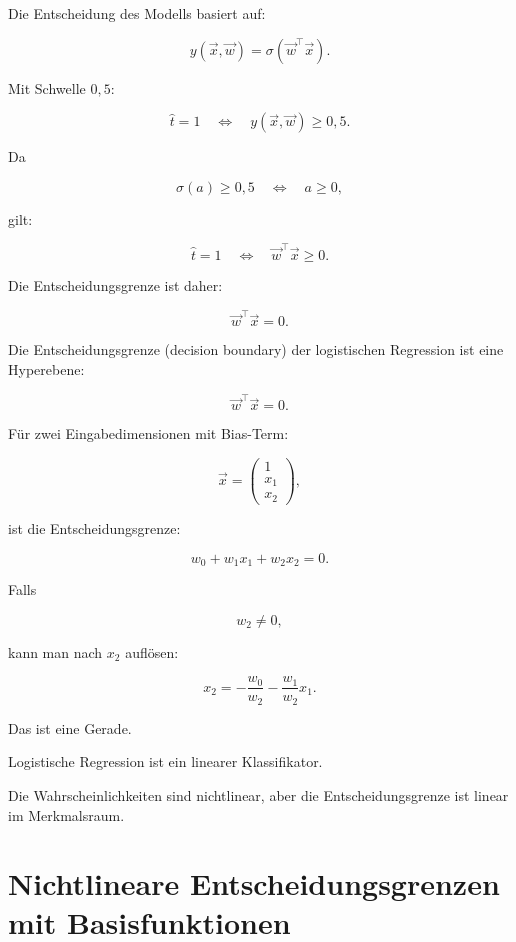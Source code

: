 Die Entscheidung des Modells basiert auf:

\[
    y(\vec{x},\vec{w})
    =
    \sigma(\vec{w}^{\top}\vec{x}).
\]

Mit Schwelle \(0{,}5\):

\[
    \hat{t}=1
    \quad
    \Longleftrightarrow
    \quad
    y(\vec{x},\vec{w})\geq 0{,}5.
\]

Da

\[
    \sigma(a)\geq 0{,}5
    \quad
    \Longleftrightarrow
    \quad
    a\geq 0,
\]

gilt:

\[
    \hat{t}=1
    \quad
    \Longleftrightarrow
    \quad
    \vec{w}^{\top}\vec{x}\geq 0.
\]

Die Entscheidungsgrenze ist daher:

\[
    \vec{w}^{\top}\vec{x}=0.
\]

\begin{definitionbox}
Die Entscheidungsgrenze (decision boundary) der logistischen Regression ist eine Hyperebene:

\[
    \vec{w}^{\top}\vec{x}=0.
\]
\end{definitionbox}

Für zwei Eingabedimensionen mit Bias-Term:

\[
    \vec{x}
    =
    \begin{pmatrix}
        1 \\
        x_1 \\
        x_2
    \end{pmatrix},
\]

ist die Entscheidungsgrenze:

\[
    w_0+w_1x_1+w_2x_2=0.
\]

Falls

\[
    w_2 \neq 0,
\]

kann man nach \(x_2\) auflösen:

\[
    x_2
    =
    -\frac{w_0}{w_2}
    -
    \frac{w_1}{w_2}x_1.
\]

Das ist eine Gerade.

\begin{conceptbox}
Logistische Regression ist ein linearer Klassifikator.

Die Wahrscheinlichkeiten sind nichtlinear, aber die Entscheidungsgrenze ist linear im Merkmalsraum.
\end{conceptbox}

\section{Nichtlineare Entscheidungsgrenzen mit Basisfunktionen}

